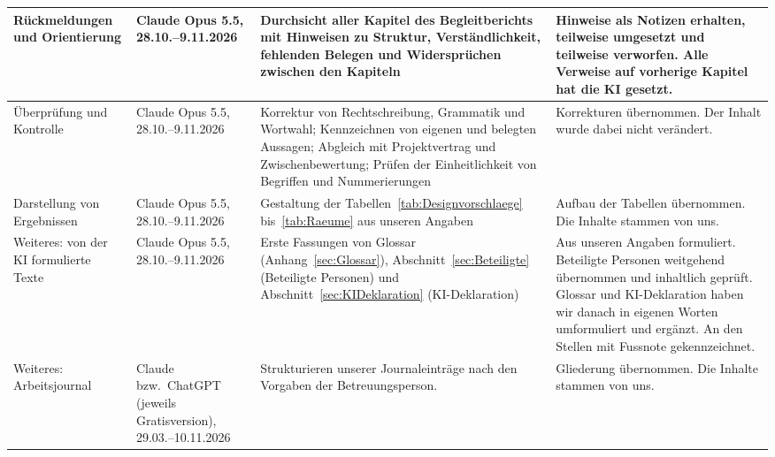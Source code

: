 \documentclass[../Main.tex]{subfiles}
\begin{document}
{\begin{longtable}{|>{\raggedright\arraybackslash}p{2.3cm}|>{\raggedright\arraybackslash}p{2.4cm}|>{\raggedright\arraybackslash}p{4.4cm}|>{\raggedright\arraybackslash}p{4.6cm}|}
        \hline
        Rückmeldungen und Orientierung & Claude Opus 5.5, 28.10.--9.11.2026 & Durchsicht aller Kapitel des Begleitberichts mit Hinweisen zu Struktur, Verständlichkeit, fehlenden Belegen und Widersprüchen zwischen den Kapiteln & Hinweise als Notizen erhalten, teilweise umgesetzt und teilweise verworfen. Alle Verweise auf vorherige Kapitel hat die KI gesetzt. \\
        \hline
        Überprüfung und Kontrolle & Claude Opus 5.5, 28.10.--9.11.2026 & Korrektur von Rechtschreibung, Grammatik und Wortwahl; Kennzeichnen von eigenen und belegten Aussagen; Abgleich mit Projektvertrag und Zwischenbewertung; Prüfen der Einheitlichkeit von Begriffen und Nummerierungen & Korrekturen übernommen. Der Inhalt wurde dabei nicht verändert. \\
        \hline
        Darstellung von Ergebnissen & Claude Opus 5.5, 28.10.--9.11.2026 & Gestaltung der Tabellen~\ref{tab:Designvorschlaege} bis~\ref{tab:Raeume} aus unseren Angaben & Aufbau der Tabellen übernommen. Die Inhalte stammen von uns. \\
        \hline
        Weiteres: von der KI formulierte Texte & Claude Opus 5.5, 28.10.--9.11.2026 & Erste Fassungen von Glossar (Anhang~\ref{sec:Glossar}), Abschnitt~\ref{sec:Beteiligte} (Beteiligte Personen) und Abschnitt~\ref{sec:KIDeklaration} (KI-Deklaration) & Aus unseren Angaben formuliert. Beteiligte Personen weitgehend übernommen und inhaltlich geprüft. Glossar und KI-Deklaration haben wir danach in eigenen Worten umformuliert und ergänzt. An den Stellen mit Fussnote gekennzeichnet. \\
        \hline
        Weiteres: Arbeitsjournal & Claude bzw.\ ChatGPT (jeweils Gratisversion), 29.03.--10.11.2026 & Strukturieren unserer Journaleinträge nach den Vorgaben der Betreuungsperson. & Gliederung übernommen. Die Inhalte stammen von uns. \\
        \hline
    \end{longtable}
}
\end{document}
